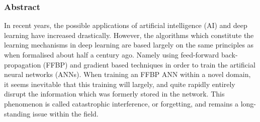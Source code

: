 





\newpage
\noindent
\begin{centering}
    \subsubsection*{Abstract}
\end{centering}

In recent years, the possible applications of artificial intelligence (AI) and deep learning have increased drastically. However, the algorithms which constitute the learning mechanisms in deep learning are based largely on the same principles as when formalised about half a century ago. Namely using feed-forward back-propagation (FFBP) and gradient based techniques in order to train the artificial neural networks (ANNs). When training an FFBP ANN within a novel domain, it seems inevitable that this training will largely, and quite rapidly entirely disrupt the information which was formerly stored in the network.
This phenomenon is called catastrophic interference, or forgetting, and remains a long-standing issue within the field.

